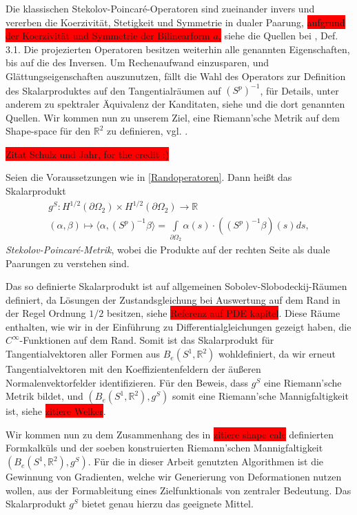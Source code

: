 Die klassischen Stekolov-Poincaré-Operatoren sind zueinander invers und vererben die Koerzivität, Stetigkeit und Symmetrie in dualer Paarung, \colorbox{red}{aufgrund der Koerzivität und Symmetrie der Bilinearform $a$,} siehe die Quellen bei \cite{bfgs1}, Def. 3.1. Die projezierten Operatoren besitzen weiterhin alle genannten Eigenschaften, bis auf die des Inversen. Um Rechenaufwand einzusparen, und Glättungseigenschaften auszunutzen, fällt die Wahl des Operators zur Definition des Skalarproduktes auf den Tangentialräumen auf $(S^p)^{-1}$, für Details, unter anderem zu spektraler Äquivalenz der Kanditaten, siehe \cite{bfgs1} und die dort genannten Quellen. Wir kommen nun zu unserem Ziel, eine Riemann'sche Metrik auf dem Shape-space für den $\mathbb{R}^2$ zu definieren, vgl. \cite{bfgs1}.

\colorbox{red}{Zitat Schulz und Jahr, for the credit :)}

\begin{defi}\label{Stek-Poi-metrik}
Seien die Voraussetzungen wie in \ref{Randoperatoren}. Dann heißt das Skalarprodukt
\begin{align*}
	g^S: H^{1/2}(\partial \Omega_2) \times H^{1/2}(\partial \Omega_2) \rightarrow \mathbb{R} \\
	(\alpha,\beta) \mapsto \langle \alpha, (S^p)^{-1}\beta \rangle = \underset{\partial \Omega_2}{\int} \alpha(s)\cdot((S^p)^{-1}\beta)(s)ds,
\end{align*}
\textit{Stekolov-Poincaré-Metrik}, wobei die Produkte auf der rechten Seite als duale Paarungen zu verstehen sind. 
\end{defi}

Das so definierte Skalarprodukt ist auf allgemeinen Sobolev-Slobodeckij-Räumen definiert, da Lösungen der Zustandsgleichung bei Auswertung auf dem Rand in der Regel Ordnung $1/2$ besitzen, siehe \colorbox{red}{Referenz auf PDE kapitel}. Diese Räume enthalten, wie wir in der Einführung zu Differentialgleichungen gezeigt haben, die $C^\infty$-Funktionen auf dem Rand. Somit ist das Skalarprodukt für Tangentialvektoren aller Formen aus $B_e(S^1, \mathbb{R}^2)$ wohldefiniert, da wir erneut Tangentialvektoren mit den Koeffizientenfeldern der äußeren Normalenvektorfelder identifizieren. Für den Beweis, dass $g^S$ eine Riemann'sche Metrik bildet, und $(B_e(S^1,\mathbb{R}^2),g^S)$ somit eine Riemann'sche Mannigfaltigkeit ist, siehe \colorbox{red}{zitiere Welker}.

Wir kommen nun zu dem Zusammenhang des in \colorbox{red}{zitiere shape calc} definierten Formkalküls und der soeben konstruierten Riemann'schen Mannigfaltigkeit $(B_e(S^1,\mathbb{R}^2),g^S)$.
Für die in dieser Arbeit genutzten Algorithmen ist die Gewinnung von Gradienten, welche wir Generierung von Deformationen nutzen wollen, aus der Formableitung eines Zielfunktionals von zentraler Bedeutung. Das Skalarprodukt $g^S$ bietet genau hierzu das geeignete Mittel.

